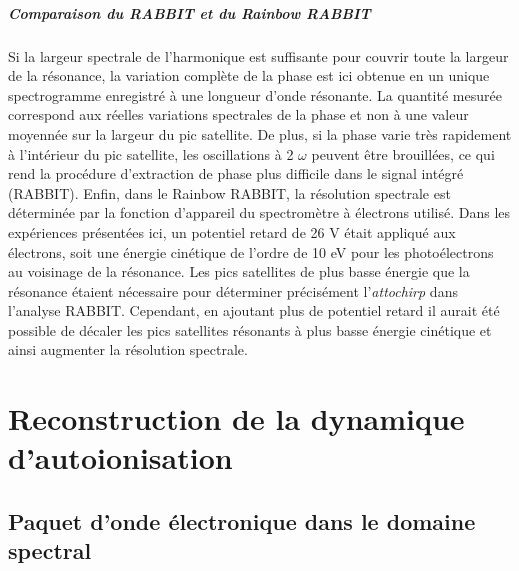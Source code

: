 \paragraph*{Comparaison du RABBIT et du Rainbow RABBIT} Si la largeur spectrale de l'harmonique est suffisante pour couvrir toute la largeur de la résonance, la variation complète de la phase est ici obtenue en un unique spectrogramme enregistré à une longueur d'onde résonante. La quantité mesurée correspond aux réelles variations spectrales de la phase et non à une valeur moyennée sur la largeur du pic satellite. De plus, si la phase varie très rapidement à l'intérieur du pic satellite, les oscillations à 2 $\omega$ peuvent être brouillées, ce qui rend la procédure d'extraction de phase plus difficile dans le signal intégré (RABBIT). Enfin, dans le Rainbow RABBIT, la résolution spectrale est déterminée par la fonction d'appareil du spectromètre à électrons utilisé. Dans les expériences présentées ici, un potentiel retard de 26 V était appliqué aux électrons, soit une énergie cinétique de l'ordre de 10 eV pour les photoélectrons au voisinage de la résonance. Les pics satellites de plus basse énergie que la résonance étaient nécessaire pour déterminer précisément l'\textit{attochirp} dans l'analyse RABBIT. Cependant, en ajoutant plus de potentiel retard il aurait été possible de décaler les pics satellites résonants à plus basse énergie cinétique et ainsi augmenter la résolution spectrale.

\chapter{Reconstruction de la dynamique d'autoionisation}
\section{Paquet d'onde électronique dans le domaine spectral}

